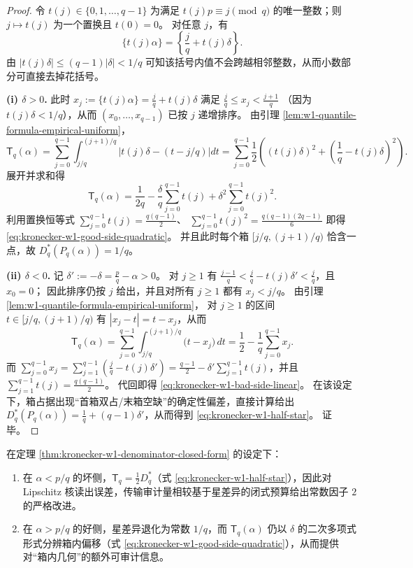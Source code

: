 \begin{proof}
令 \(t(j)\in\{0,1,\dots,q-1\}\) 为满足
\(
t(j)p\equiv j\pmod q
\)
的唯一整数；则 \(j\mapsto t(j)\) 为一个置换且 \(t(0)=0\)。
对任意 \(j\)，有
\[
\{t(j)\alpha\}
=\left\{\frac{j}{q}+t(j)\delta\right\}.
\]
由 \(|t(j)\delta|\le (q-1)|\delta|<1/q\) 可知该括号内值不会跨越相邻整数，从而小数部分可直接去掉花括号。
\par
\textbf{(i) \(\delta>0\).}
此时 \(x_j:=\{t(j)\alpha\}=\frac{j}{q}+t(j)\delta\) 满足
\(
\frac{j}{q}\le x_j<\frac{j+1}{q}
\)
（因为 \(t(j)\delta<1/q\)），从而 \((x_0,\dots,x_{q-1})\) 已按 \(j\) 递增排序。
由引理 \ref{lem:w1-quantile-formula-empirical-uniform}，
\[
\mathsf{T}_q(\alpha)=\sum_{j=0}^{q-1}\int_{j/q}^{(j+1)/q}\left|t(j)\delta-(t-j/q)\right|dt
=\sum_{j=0}^{q-1}\frac12\left((t(j)\delta)^2+\left(\frac1q-t(j)\delta\right)^2\right).
\]
展开并求和得
\[
\mathsf{T}_q(\alpha)
=\frac1{2q}-\frac{\delta}{q}\sum_{j=0}^{q-1}t(j)+\delta^2\sum_{j=0}^{q-1}t(j)^2.
\]
利用置换恒等式
\(
\sum_{j=0}^{q-1}t(j)=\frac{q(q-1)}2
\)、
\(
\sum_{j=0}^{q-1}t(j)^2=\frac{q(q-1)(2q-1)}6
\)
即得 \eqref{eq:kronecker-w1-good-side-quadratic}。
并且此时每个箱 \([j/q,(j+1)/q)\) 恰含一点，故 \(D_q^\ast(P_q(\alpha))=1/q\)。
\par
\textbf{(ii) \(\delta<0\).}
记 \(\delta':=-\delta=\frac pq-\alpha>0\)。
对 \(j\ge 1\) 有
\(
\frac{j-1}{q}<\frac{j}{q}-t(j)\delta'<\frac{j}{q}
\)，且 \(x_0=0\)；
因此排序仍按 \(j\) 给出，并且对所有 \(j\ge 1\) 都有 \(x_j<j/q\)。
由引理 \ref{lem:w1-quantile-formula-empirical-uniform}，
对 \(j\ge 1\) 的区间 \(t\in[j/q,(j+1)/q)\) 有 \(|x_j-t|=t-x_j\)，从而
\[
\mathsf{T}_q(\alpha)
=\sum_{j=0}^{q-1}\int_{j/q}^{(j+1)/q}\bigl(t-x_j\bigr)\,dt
=\frac12-\frac1q\sum_{j=0}^{q-1}x_j.
\]
而
\(
\sum_{j=0}^{q-1}x_j
=\sum_{j=1}^{q-1}\left(\frac{j}{q}-t(j)\delta'\right)
=\frac{q-1}{2}-\delta'\sum_{j=1}^{q-1}t(j)
\)，并且 \(\sum_{j=1}^{q-1}t(j)=\frac{q(q-1)}2\)。
代回即得 \eqref{eq:kronecker-w1-bad-side-linear}。
在该设定下，箱占据出现“首箱双占/末箱空缺”的确定性偏差，直接计算给出
\(
D_q^\ast(P_q(\alpha))=\frac1q+(q-1)\delta'
\)，从而得到 \eqref{eq:kronecker-w1-half-star}。
证毕。
\end{proof}

\begin{corollary}[坏侧二分改进与好侧箱内灵敏性]\label{cor:kronecker-w1-two-sided-interpretation}
在定理 \ref{thm:kronecker-w1-denominator-closed-form} 的设定下：
\begin{enumerate}
  \item 在 \(\alpha<p/q\) 的坏侧，\(\mathsf{T}_q=\tfrac12 D_q^\ast\)（式 \eqref{eq:kronecker-w1-half-star}），因此对 Lipschitz 核读出误差，传输审计量相较基于星差异的闭式预算给出常数因子 \(2\) 的严格改进。
  \item 在 \(\alpha>p/q\) 的好侧，星差异退化为常数 \(1/q\)，而 \(\mathsf{T}_q(\alpha)\) 仍以 \(\delta\) 的二次多项式形式分辨箱内偏移（式 \eqref{eq:kronecker-w1-good-side-quadratic}），从而提供对“箱内几何”的额外可审计信息。
\end{enumerate}
\end{corollary}

